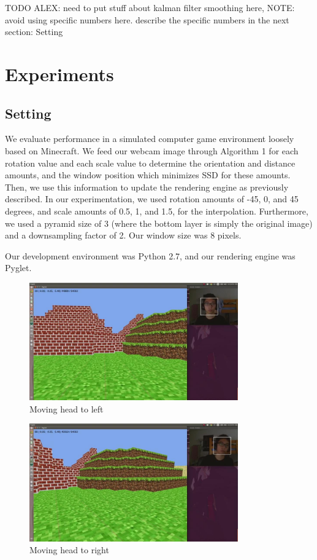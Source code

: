 \documentclass[10pt,twocolumn,letterpaper]{article}
\begin{document}
TODO ALEX: need to put stuff about kalman filter smoothing here, 
NOTE: avoid using specific numbers here. describe the specific numbers in
the next section: Setting

\section{Experiments}

\subsection*{Setting}
We evaluate performance in a simulated computer game environment loosely based
on Minecraft. We feed our webcam image through Algorithm 1 for each rotation
value and each scale value to determine the orientation and distance amounts,
and the window position which minimizes SSD for these amounts. Then, we use this
information to update the rendering engine as previously described. In our experimentation,
we used rotation amounts of -45, 0, and 45 degrees, and scale amounts of 0.5, 1, and 1.5,
for the interpolation. Furthermore, we used a pyramid size of 3 (where the bottom
layer is simply the original image) and a downsampling factor of 2. Our window size
was 8 pixels.

Our development environment was Python 2.7, and our rendering engine was Pyglet.
\begin{figure}[ht!]
\centering
\includegraphics[width=90mm]{left_trans.jpg}
\caption{Moving head to left \label{overflow}}
\end{figure}

\begin{figure}[ht!]
\centering
\includegraphics[width=90mm]{right_trans.jpg}
\caption{Moving head to right\label{overflow}}
\end{figure}
\end{document}
